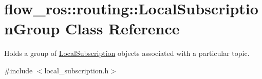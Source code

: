 \hypertarget{classflow__ros_1_1routing_1_1_local_subscription_group}{}\section{flow\+\_\+ros\+:\+:routing\+:\+:Local\+Subscription\+Group Class Reference}
\label{classflow__ros_1_1routing_1_1_local_subscription_group}


Holds a group of \hyperlink{classflow__ros_1_1routing_1_1_local_subscription}{Local\+Subscription} objects associated with a particular topic.  




{\ttfamily \#include $<$local\+\_\+subscription.\+h$>$}

